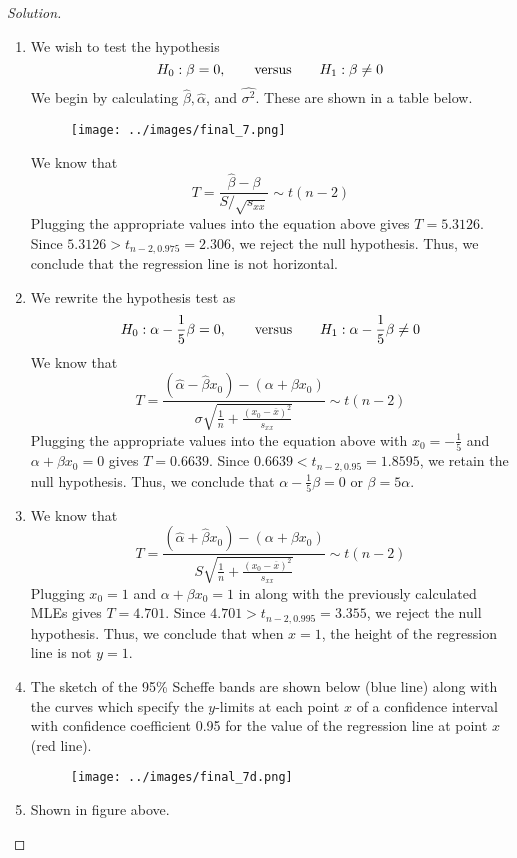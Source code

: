 \documentclass[letterpaper, 12pt]{article}
\begin{document}
\begin{proof}[Solution]
    \begin{enumerate}
        \item We wish to test the hypothesis 
            $$H_0: \beta = 0, \qquad \textnormal{versus} \qquad H_1: \beta \neq 0$$ 
            We begin by calculating $\hat{\beta}, \hat{\alpha}$, and $\hat{\sigma^2}$. These are
            shown in a table below.
            \begin{figure}[H]
                \centering
                \texttt{[image: ../images/final\_7.png]}
            \end{figure}
            We know that 
            $$T = \frac{\hat{\beta} - \beta}{S/\sqrt{s_{xx}}} \sim t(n - 2)$$ 
            Plugging the appropriate values into the equation above gives $T = 5.3126$. Since
            $5.3126 > t_{n - 2, 0.975} = 2.306$, we reject the null hypothesis. Thus, we conclude that 
            the regression line is not horizontal.
        \item We rewrite the hypothesis test as 
            $$H_0: \alpha - \frac{1}{5}\beta = 0, \qquad \textnormal{versus} \qquad H_1: \alpha -
            \frac{1}{5}\beta \neq 0$$ 
            We know that 
            $$T = \frac{(\hat{\alpha} - \hat{\beta}x_0) - (\alpha + \beta
            x_0)}{\sigma\sqrt{\frac{1}{n} + \frac{(x_0 - \overline{x})^2}{s_{xx}}}} \sim t(n - 2)$$ 
            Plugging the appropriate values into the equation above with $x_0 = -\frac{1}{5}$ and
            $\alpha + \beta x_0 = 0$ gives $T = 0.6639$. Since $0.6639 < t_{n - 2, 0.95} = 1.8595$,
            we retain the null hypothesis. Thus, we conclude that $\alpha - \frac{1}{5}\beta = 0$ or
            $\beta = 5\alpha$.
        \item We know that 
            $$T = \frac{(\hat{\alpha} + \hat{\beta}x_0) - (\alpha + \beta x_0)}{S\sqrt{\frac{1}{n} +
            \frac{(x_0 - \overline{x})^2}{s_{xx}}}} \sim t(n - 2)$$ 
            Plugging $x_0 = 1$ and $\alpha + \beta x_0 = 1$ in along with the previously calculated
            MLEs gives $T = 4.701$. Since $4.701 > t_{n - 2, 0.995} = 3.355$, we reject the null
            hypothesis. Thus, we conclude that when $x = 1$, the height of the regression line is
            not $y = 1$. 
        \item The sketch of the 95\% Scheffe bands are shown below (blue line) along with the curves
            which specify the $y$-limits at each point $x$ of a confidence interval with confidence
            coefficient 0.95 for the value of the regression line at point $x$ (red line).
            \begin{figure}[H]
                \centering
                \texttt{[image: ../images/final\_7d.png]}
            \end{figure}
        \item Shown in figure above.
    \end{enumerate}
\end{proof}
\end{document}
